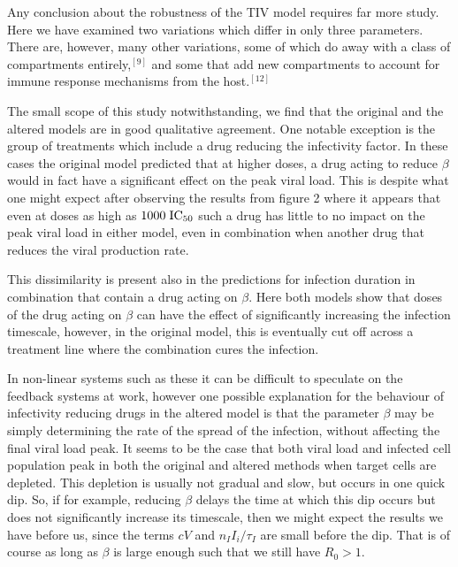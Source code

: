 \documentclass[a4paper,11pt]{article}
\begin{document}
Any conclusion about the robustness of the TIV model requires far more study. Here we have examined two variations which differ in only three parameters. There are, however, many other variations, some of which do away with a class of compartments entirely,$^{[9]}$ and some that add new compartments to account for immune response mechanisms from the host.$^{[12]}$

The small scope of this study notwithstanding, we find that the original and the altered models are in good qualitative agreement. One notable exception is the group of treatments which include a drug reducing the infectivity factor. In these cases the original model predicted that at higher doses, a drug acting to reduce $\beta$ would in fact have a significant effect on the peak viral load. This is despite what one might expect after observing the results from figure 2 where it appears that even at doses as high as $1000 \hspace{1mm} \mathrm{IC}_{50}$ such a drug has little to no impact on the peak viral load in either model, even in combination when another drug that reduces the viral production rate.

This dissimilarity is present also in the predictions for infection duration in combination that contain a drug acting on $\beta$. Here both models show that doses of the drug acting on $\beta$ can have the effect of significantly increasing the infection timescale, however, in the original model, this is eventually cut off across a treatment line where the combination cures the infection.

In non-linear systems such as these it can be difficult to speculate on the feedback systems at work, however one possible explanation for the behaviour of infectivity reducing drugs in the altered model is that the parameter $\beta$ may be simply determining the rate of the spread of the infection, without affecting the final viral load peak. It seems to be the case that both viral load and infected cell population peak in both the original and altered methods when target cells are depleted. This depletion is usually not gradual and slow, but occurs in one quick dip. So, if for example, reducing $\beta$ delays the time at which this dip occurs but does not significantly increase its timescale, then we might expect the results we have before us, since the terms $cV$ and $n_II_i/\tau_I$ are small before the dip. That is of course as long as $\beta$ is large enough such that we still have $R_0 > 1$.
\end{document}
